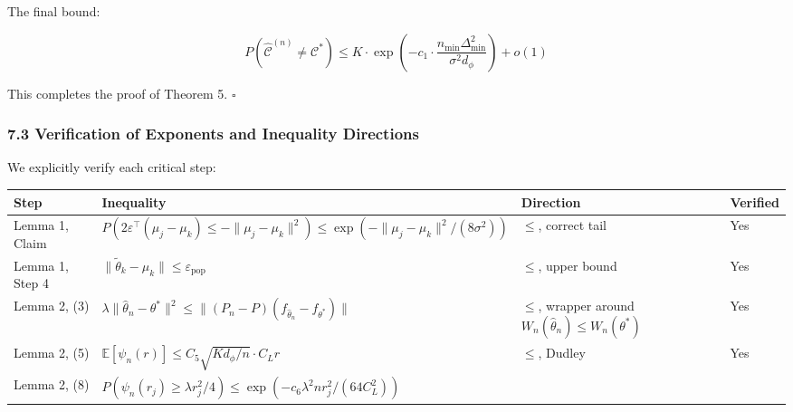 \documentclass[
  12pt,
]{ctexart}
\begin{document}
The final bound:

\[P(\hat{\mathcal{C}}^{(n)} \neq \mathcal{C}^*) \leq K \cdot \exp\left(-c_1 \cdot \frac{n_{\min} \Delta_{\min}^2}{\sigma^2 d_\phi}\right) + o(1)\]

This completes the proof of Theorem 5. \(\square\)

\subsubsection{7.3 Verification of Exponents and Inequality
Directions}\label{verification-of-exponents-and-inequality-directions}

We explicitly verify each critical step:

\begin{longtable}[]{@{}
  >{\raggedright\arraybackslash}p{}
  >{\raggedright\arraybackslash}p{}
  >{\raggedright\arraybackslash}p{}
  >{\raggedright\arraybackslash}p{}@{}}
\toprule\noalign{}
\begin{minipage}[b]{\linewidth}\raggedright
Step
\end{minipage} & \begin{minipage}[b]{\linewidth}\raggedright
Inequality
\end{minipage} & \begin{minipage}[b]{\linewidth}\raggedright
Direction
\end{minipage} & \begin{minipage}[b]{\linewidth}\raggedright
Verified
\end{minipage} \\
\midrule\noalign{}
\endhead
\bottomrule\noalign{}
\endlastfoot
Lemma 1, Claim &
\(P(2\varepsilon^\top(\mu_j - \mu_k) \leq -\|\mu_j-\mu_k\|^2) \leq \exp(-\|\mu_j-\mu_k\|^2/(8\sigma^2))\)
& \(\leq\), correct tail & Yes \\
Lemma 1, Step 4 &
\(\|\tilde{\theta}_k - \mu_k\| \leq \varepsilon_{\text{pop}}\) &
\(\leq\), upper bound & Yes \\
Lemma 2, (3) &
\(\lambda\|\hat{\theta}_n - \theta^*\|^2 \leq \|(P_n-P)(f_{\hat{\theta}_n} - f_{\theta^*})\|\)
& \(\leq\), wrapper around \(W_n(\hat{\theta}_n) \leq W_n(\theta^*)\) &
Yes \\
Lemma 2, (5) &
\(\mathbb{E}[\psi_n(r)] \leq C_5\sqrt{K d_\phi/n}\cdot C_L r\) &
\(\leq\), Dudley & Yes \\
Lemma 2, (8) &
\(P(\psi_n(r_j) \geq \lambda r_j^2/4) \leq \exp(-c_6 \lambda^2 n r_j^2/(64 C_L^2))\)

\end{longtable}
\end{document}
